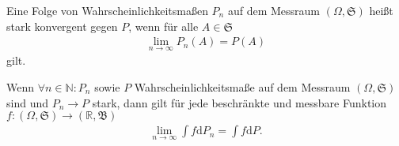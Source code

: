\begin{definition}
    Eine Folge von Wahrscheinlichkeitsmaßen $P_n$ auf dem Messraum $(\Omega,\mathfrak{S})$ heißt stark konvergent gegen $P$, wenn für alle $A\in\mathfrak{S}$
    \begin{align}
        \lim_{n\to\infty}P_n(A)=P(A)
    \end{align}
    gilt.
\end{definition}
\begin{lemma}
    Wenn $\forall n\in\mathbb{N}:P_n$ sowie $P$ Wahrscheinlichkeitsmaße auf dem Messraum $(\Omega,\mathfrak{S})$ sind und $P_n\to P$ stark, dann gilt für jede beschränkte und messbare Funktion $f:(\Omega,\mathfrak{S})\to(\mathbb{R},\mathfrak{B})$
    \begin{align*}
        \lim_{n\to\infty}\int f\mathrm{d}P_n=\int f\mathrm{d}P.
    \end{align*}
\end{lemma}
